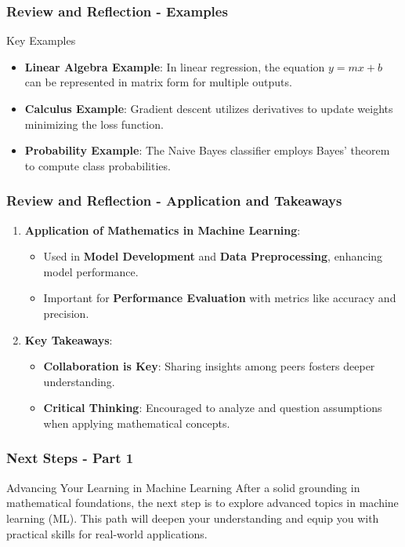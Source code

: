 \documentclass[aspectratio=169]{beamer}
\begin{document}
\begin{frame}[fragile]
    \frametitle{Review and Reflection - Examples}
    
    \begin{block}{Key Examples}
        \begin{itemize}
            \item \textbf{Linear Algebra Example}: In linear regression, the equation $y = mx + b$ can be represented in matrix form for multiple outputs.
            \item \textbf{Calculus Example}: Gradient descent utilizes derivatives to update weights minimizing the loss function.
            \item \textbf{Probability Example}: The Naive Bayes classifier employs Bayes' theorem to compute class probabilities.
        \end{itemize}
    \end{block}
\end{frame}

\begin{frame}[fragile]
    \frametitle{Review and Reflection - Application and Takeaways}
    
    \begin{enumerate}
        \item \textbf{Application of Mathematics in Machine Learning}:
        \begin{itemize}
            \item Used in \textbf{Model Development} and \textbf{Data Preprocessing}, enhancing model performance.
            \item Important for \textbf{Performance Evaluation} with metrics like accuracy and precision.
        \end{itemize}
        
        \item \textbf{Key Takeaways}:
        \begin{itemize}
            \item \textbf{Collaboration is Key}: Sharing insights among peers fosters deeper understanding.
            \item \textbf{Critical Thinking}: Encouraged to analyze and question assumptions when applying mathematical concepts.
        \end{itemize}
    \end{enumerate}
\end{frame}

\begin{frame}[fragile]
    \frametitle{Next Steps - Part 1}
    \begin{block}{Advancing Your Learning in Machine Learning}
        After a solid grounding in mathematical foundations, the next step is to explore advanced topics in machine learning (ML). This path will deepen your understanding and equip you with practical skills for real-world applications.
    \end{block}
\end{frame}
\end{document}
